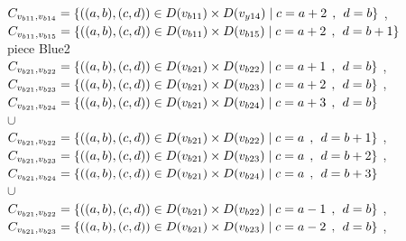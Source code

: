 \\$C_{v_{b11},v_{b14}}=\{((a,b),(c,d))\in D(v_{b11}) \times D(v_{y14})\mid c = a + 2\hspace{1ex} , \hspace{1ex}  d = b    \}$ , 
\\$C_{v_{b11},v_{b15}}=\{((a,b),(c,d))\in D(v_{b11}) \times D(v_{b15})\mid c = a + 2\hspace{1ex} , \hspace{1ex}  d = b + 1 \}$  
\\ piece Blue2 
\\$C_{v_{b21},v_{b22}}=\{((a,b),(c,d))\in D(v_{b21}) \times D(v_{b22})\mid c = a + 1\hspace{1ex} , \hspace{1ex}  d = b    \}$ , 
\\$C_{v_{b21},v_{b23}}=\{((a,b),(c,d))\in D(v_{b21}) \times D(v_{b23})\mid c = a + 2\hspace{1ex} , \hspace{1ex}  d = b    \}$ , 
\\$C_{v_{b21},v_{b24}}=\{((a,b),(c,d))\in D(v_{b21}) \times D(v_{b24})\mid c = a + 3\hspace{1ex} , \hspace{1ex}  d = b    \}$  
\\$\cup$
\\$C_{v_{b21},v_{b22}}=\{((a,b),(c,d))\in D(v_{b21}) \times D(v_{b22})\mid c = a  \hspace{1ex} , \hspace{1ex}  d = b + 1 \}$ , 
\\$C_{v_{b21},v_{b23}}=\{((a,b),(c,d))\in D(v_{b21}) \times D(v_{b23})\mid c = a  \hspace{1ex} , \hspace{1ex}  d = b + 2 \}$ , 
\\$C_{v_{b21},v_{b24}}=\{((a,b),(c,d))\in D(v_{b21}) \times D(v_{b24})\mid c = a  \hspace{1ex} , \hspace{1ex}  d = b + 3 \}$  
\\$\cup$
\\$C_{v_{b21},v_{b22}}=\{((a,b),(c,d))\in D(v_{b21}) \times D(v_{b22})\mid c = a - 1\hspace{1ex} , \hspace{1ex}  d = b   \}$ , 
\\$C_{v_{b21},v_{b23}}=\{((a,b),(c,d))\in D(v_{b21}) \times D(v_{b23})\mid c = a - 2\hspace{1ex} , \hspace{1ex}  d = b   \}$ , 
